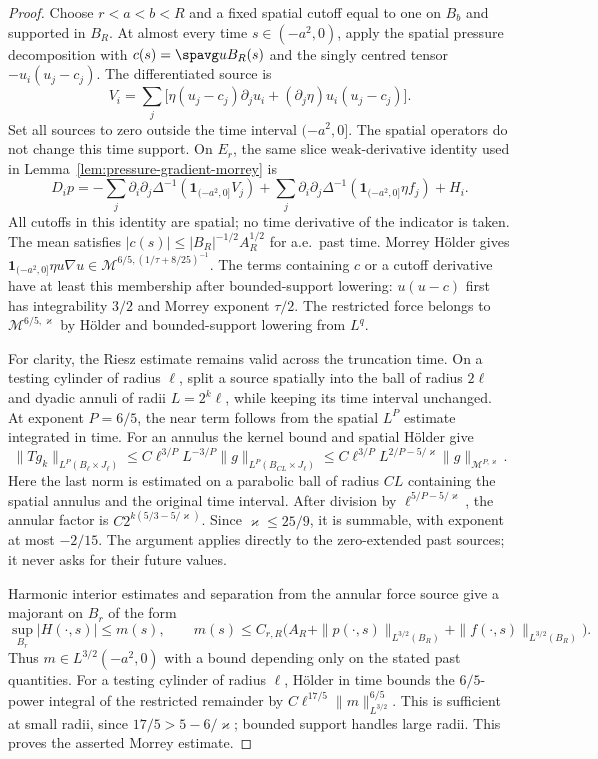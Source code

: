\documentclass[11pt,reqno]{amsart}
\begin{document}
\begin{proof}
Choose $r<a<b<R$ and a fixed spatial cutoff equal to one on $B_b$
and supported in $B_R$. At almost every time $s\in(-a^2,0)$, apply
the spatial pressure decomposition with
$c(s)=\spavg u{B_R}(s)$ and the singly centred tensor
$-u_i(u_j-c_j)$. The differentiated source is
\[
 V_i=\sum_j\bigl[\eta(u_j-c_j)\partial_j u_i
                 +(\partial_j\eta)u_i(u_j-c_j)\bigr].
\]
Set all sources to zero outside the time interval $(-a^2,0]$.
The spatial operators do not change this time support. On $E_r$, the
same slice weak-derivative identity used in
Lemma~\ref{lem:pressure-gradient-morrey} is
\[
 D_i p=-\sum_j\partial_i\partial_j\Delta^{-1}
              (\mathbf1_{(-a^2,0]}V_j)
       +\sum_j\partial_i\partial_j\Delta^{-1}
              (\mathbf1_{(-a^2,0]}\eta f_j)+H_i.
\]
All cutoffs in this identity are spatial; no time derivative of the
indicator is taken. The mean satisfies
$|c(s)|\le |B_R|^{-1/2}A_R^{1/2}$ for a.e.\ past time.
Morrey H\"older gives
$\mathbf1_{(-a^2,0]}\eta u\nabla u
 \in\mathcal M^{6/5,(1/\tau+8/25)^{-1}}$.
The terms containing $c$ or a cutoff derivative have at least this
membership after bounded-support lowering: $u(u-c)$ first has
integrability $3/2$ and Morrey exponent $\tau/2$.
The restricted force belongs to $\mathcal M^{6/5,\varkappa}$ by
H\"older and bounded-support lowering from $L^q$.

For clarity, the Riesz estimate remains valid across the truncation
time. On a testing cylinder of radius $\ell$, split a source spatially
into the ball of radius $2\ell$ and dyadic annuli of radii $L=2^k\ell$,
while keeping its time interval unchanged. At exponent $P=6/5$, the
near term follows from the spatial $L^P$ estimate integrated in time.
For an annulus the kernel bound and spatial H\"older give
\[
 \|Tg_k\|_{L^P(B_\ell\times J_\ell)}
 \le C\ell^{3/P}L^{-3/P}
                 \|g\|_{L^P(B_{CL}\times J_\ell)}
 \le C\ell^{3/P}L^{2/P-5/\varkappa}
                 \|g\|_{\mathcal M^{P,\varkappa}}.
\]
Here the last norm is estimated on a parabolic ball of radius $CL$
containing the spatial annulus and the original time interval.
After division by $\ell^{5/P-5/\varkappa}$, the annular factor is
$C2^{k(5/3-5/\varkappa)}$. Since $\varkappa\le25/9$, it is summable,
with exponent at most $-2/15$. The argument applies directly to the
zero-extended past sources; it never asks for their future values.

Harmonic interior estimates and separation from the annular force
source give a majorant on $B_r$ of the form
\[
 \sup_{B_r}|H(\cdot,s)|\le m(s),\qquad
 m(s)\le C_{r,R}\bigl(A_R+
       \|p(\cdot,s)\|_{L^{3/2}(B_R)}+
       \|f(\cdot,s)\|_{L^{3/2}(B_R)}\bigr).
\]
Thus $m\in L^{3/2}(-a^2,0)$ with a bound depending only on the stated
past quantities. For a testing cylinder of radius $\ell$, H\"older in
time bounds the $6/5$-power integral of the restricted remainder by
$C\ell^{17/5}\|m\|_{L^{3/2}}^{6/5}$. This is sufficient at small radii,
since $17/5>5-6/\varkappa$; bounded support handles large radii.
This proves the asserted Morrey estimate.


\end{proof}
\end{document}
